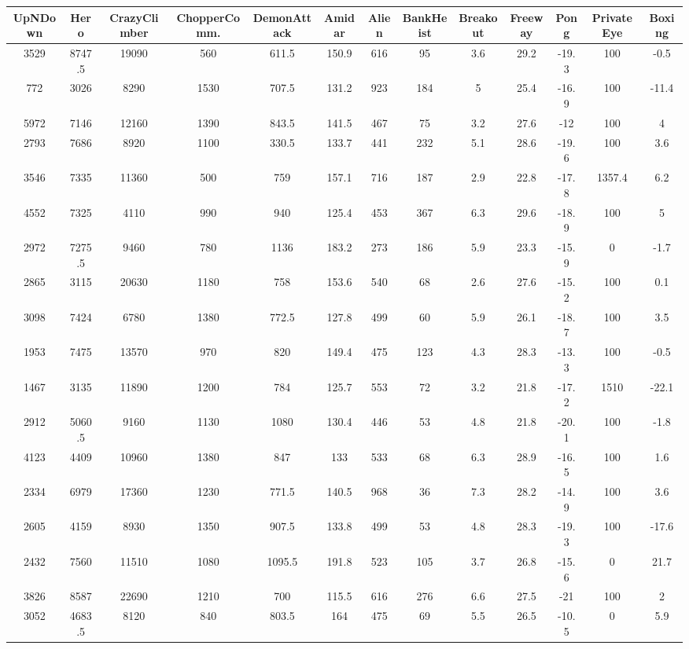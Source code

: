 \documentclass{article}
\begin{document}
\begin{table*}[!ht]
\centering
\small
\setlength\tabcolsep{2.5pt}
\begin{tabular}{c|c|c|c|c|c|c|c|c|c|c|c|c}
\hline
UpNDown &	Hero &	CrazyClimber &	ChopperComm. &	DemonAttack &	Amidar &	Alien &	BankHeist &	Breakout &	Freeway &	Pong &	PrivateEye &	Boxing \\
\hline
3529 & 8747.5 &	19090 &	560 &	611.5 &	150.9 &	616 &	95 &	3.6 &	29.2 &	-19.3 &	100 &	-0.5 \\
772 & 3026 &	8290 &	1530 &	707.5 &	131.2 &	923 &	184	& 5 &	25.4 &	-16.9 &	100 &	-11.4 \\
5972 & 7146 &	12160 &	1390 &	843.5 &	141.5 &	467 &	75 &	3.2 &	27.6 &	-12 &	100 &	4 \\
2793 &	7686 &	8920 &	1100 &	330.5 &	133.7 &	441 &	232 &	5.1 &	28.6 &	-19.6 &	100 &	3.6 \\
3546 &	7335 &	11360 &	500 &	759 &	157.1 &	716 &	187 &	2.9 &	22.8 &	-17.8 &	1357.4 &	6.2 \\
4552 &	7325 &	4110 &	990 &	940 &	125.4 &	453 &	367 &	6.3 &	29.6 &	-18.9 &	100 &	5 \\
2972 &	7275.5 &	9460 &	780 &	1136 &	183.2 &	273 &	186 &	5.9 &	23.3 &	-15.9 &	0 &	-1.7 \\
2865 &	3115 &	20630 &	1180 &	758 &	153.6 &	540 &	68 &	2.6 &	27.6 &	-15.2 &	100 &	0.1 \\
3098 &	7424 &	6780 &	1380 &	772.5 &	127.8 &	499 &	60 &	5.9 &	26.1 &	-18.7 &	100 &	3.5 \\
1953 &	7475 &	13570 &	970 &	820 &	149.4 &	475 &	123 &	4.3 &	28.3 &	-13.3 &	100 &	-0.5 \\
1467 &	3135 &	11890 &	1200 &	784 &	125.7 &	553 &	72 &	3.2 &	21.8 &	-17.2 &	1510 &	-22.1 \\
2912 &	5060.5 &	9160 &	1130 &	1080 &	130.4 &	446 &	53 &	4.8 &	21.8 &	-20.1 &	100 &	-1.8 \\
4123 &	4409 &	10960 &	1380 &	847 &	133 &	533 &	68 &	6.3 &	28.9 &	-16.5 &	100 &	1.6 \\
2334 &	6979 &	17360 &	1230 &	771.5 &	140.5 &	968 &	36 &	7.3 &	28.2 &	-14.9 &	100 &	3.6 \\
2605 &	4159 &	8930 &	1350 &	907.5 &	133.8 &	499 &	53 &	4.8 &	28.3 &	-19.3 &	100 &	-17.6 \\
2432 &	7560 &	11510 &	1080 &	1095.5 &	191.8 &	523 &	105 &	3.7 &	26.8 &	-15.6 &	0	 & 21.7 \\
3826 &	8587 &	22690 &	1210 &	700 &	115.5 &	616	 &276	 &6.6 &	27.5	 &-21	 &100	 &2 \\
3052 &	4683.5 &	8120 &	840 &	803.5 &	164 &	475 &	69	 &5.5 &	26.5 &	-10.5 &	0	 &5.9 \\

\end{tabular}
\end{table*}
\end{document}
